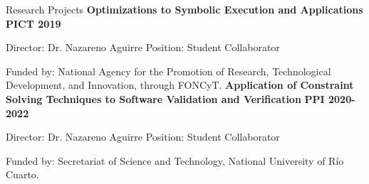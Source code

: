 
\begin{rubric}{Research Projects}
    \textbf{Optimizations to Symbolic Execution and Applications}\newline
    \textbf{PICT 2019}\par
    Director: Dr. Nazareno Aguirre\newline
    Position: Student Collaborator\par
    Funded by: National Agency for the Promotion of Research, Technological Development, and Innovation, through FONCyT.
    \textbf{Application of Constraint Solving Techniques to Software Validation and Verification}\newline
    \textbf{PPI 2020-2022}\par
    Director: Dr. Nazareno Aguirre\newline
    Position: Student Collaborator\par
    Funded by: Secretariat of Science and Technology, National University of Río Cuarto.
\end{rubric}